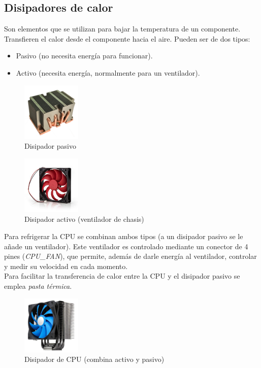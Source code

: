 \documentclass[12pt,spanish]{article}
\begin{document}
\subsection{Disipadores de calor}
Son elementos que se utilizan para bajar la temperatura de un componente. Transfieren el calor desde el componente hacia el aire. Pueden ser de dos tipos:
\begin{itemize}
	\item Pasivo (no necesita energía para funcionar).

	\item Activo (necesita energía, normalmente para un ventilador).
\end{itemize}
\begin{figure}[H]
	\centering
	\includegraphics[width=0.25\textwidth]{passive.jpg}
	\caption{Disipador pasivo}
\end{figure}

\begin{figure}[H]
	\centering
	\includegraphics[width=0.25\textwidth]{fan.jpg}
	\caption{Disipador activo (ventilador de chasis)}
\end{figure}

Para refrigerar la CPU se combinan ambos tipos (a un disipador pasivo se le añade un ventilador). Este ventilador es controlado mediante un conector de 4 pines (\textit{CPU\_FAN}), que permite, además de darle energía al ventilador, controlar y medir su velocidad en cada momento.\\

Para facilitar la transferencia de calor entre la CPU y el disipador pasivo se emplea \textit{pasta térmica}.

\begin{figure}[H]
	\centering
	\includegraphics[width=0.25\textwidth]{cpufan.jpg}
	\caption{Disipador de CPU (combina activo y pasivo)}
\end{figure}
\end{document}
